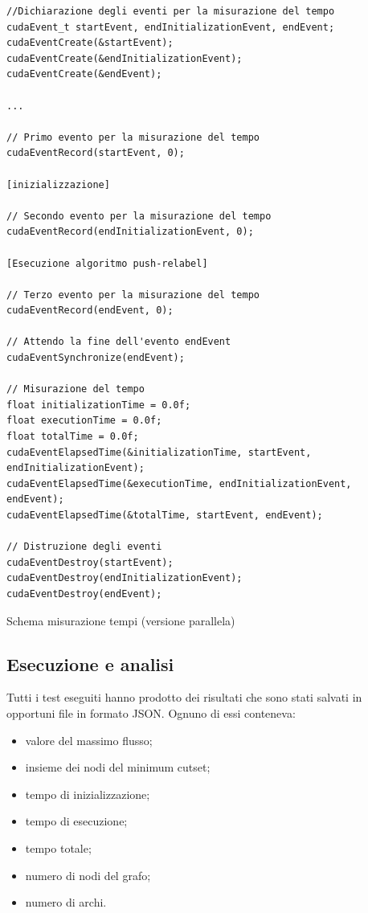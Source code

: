                 \begin{listing}[ht]
                \begin{verbatim}
//Dichiarazione degli eventi per la misurazione del tempo
cudaEvent_t startEvent, endInitializationEvent, endEvent;
cudaEventCreate(&startEvent);
cudaEventCreate(&endInitializationEvent);
cudaEventCreate(&endEvent);

...

// Primo evento per la misurazione del tempo
cudaEventRecord(startEvent, 0);

[inizializzazione]

// Secondo evento per la misurazione del tempo
cudaEventRecord(endInitializationEvent, 0);

[Esecuzione algoritmo push-relabel]

// Terzo evento per la misurazione del tempo
cudaEventRecord(endEvent, 0);

// Attendo la fine dell'evento endEvent
cudaEventSynchronize(endEvent);

// Misurazione del tempo
float initializationTime = 0.0f;
float executionTime = 0.0f;
float totalTime = 0.0f;
cudaEventElapsedTime(&initializationTime, startEvent, endInitializationEvent);
cudaEventElapsedTime(&executionTime, endInitializationEvent, endEvent);
cudaEventElapsedTime(&totalTime, startEvent, endEvent);

// Distruzione degli eventi
cudaEventDestroy(startEvent);
cudaEventDestroy(endInitializationEvent);
cudaEventDestroy(endEvent);
                \end{verbatim}
                \caption{Schema misurazione tempi (versione parallela)}\label{code:tempi-paralleli}
                \end{listing}            

    \newpage
     
    \subsection{Esecuzione e analisi}

        Tutti i test eseguiti hanno prodotto dei risultati che sono stati salvati in opportuni file in formato JSON.
        Ognuno di essi conteneva:
        \begin{itemize}
            \item valore del massimo flusso;
            \item insieme dei nodi del minimum cutset;
            \item tempo di inizializzazione;
            \item tempo di esecuzione;
            \item tempo totale;
            \item numero di nodi del grafo;
            \item numero di archi.
        \end{itemize}

